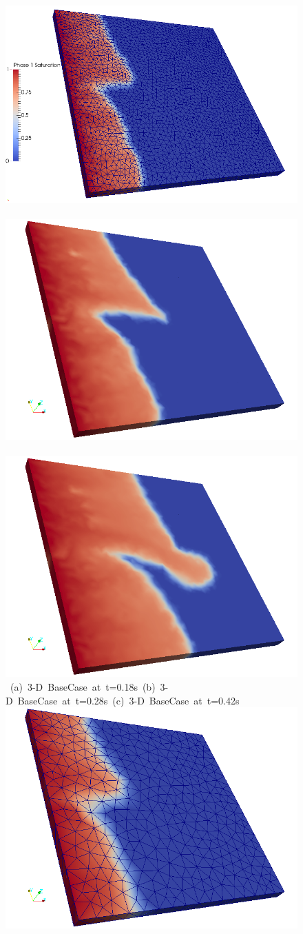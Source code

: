 \begin{landscape}
\begin{figure}[ht] 
\vbox{\vspace{-1cm}
\hspace{0.0cm} \hbox{\includegraphics[width=.6\textwidth]{./Pics/3D_BaseCase/3D_BaseCase_Saturation_tdot18withMesh2.png}
      \includegraphics[width=.5\textwidth]{./Pics/3D_BaseCase/3D_BaseCase_Saturation_tdot28.png}
      \includegraphics[width=.5\textwidth]{./Pics/3D_BaseCase/3D_BaseCase_Saturation_tdot42.png}}
\vspace{0.cm}
\hbox{\hspace{0.5cm} (a) 3-D BaseCase at t=0.18s \hspace{1.0cm} (b) 3-D BaseCase at t=0.28s \hspace{3.0cm} (c) 3-D BaseCase at t=0.42s}
\vspace{0.5cm}
\hbox{
      \includegraphics[width=.5\textwidth]{./Pics/3D_HOSVDCase/3D_HOSVDCase_Saturation_tdot18withMesh.png}
}}
\end{figure}
\end{landscape}
